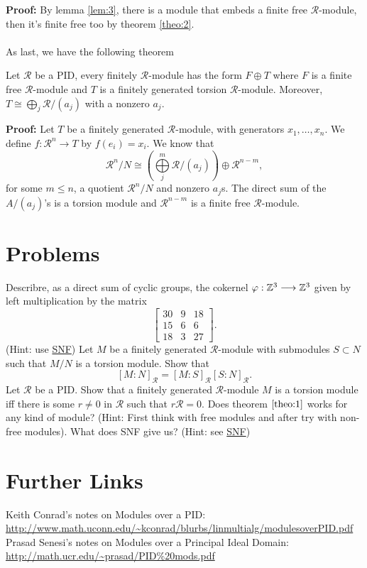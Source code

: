 \documentclass[11pt]{scrartcl}
\newcommand{\CR}{\mathcal R}
\begin{document}
\textbf{Proof: }By lemma \ref{lem:3}, there is a module that embeds a finite
free $\CR$-module, then it's finite free too by theorem \ref{theo:2}. \qedsymbol \\ \\
As last, we have the following theorem
\begin{theorem}
  \label{lem:5}
  Let $\CR$ be a PID, every finitely $\CR$-module has the form $F \oplus T$ where
  $F$ is a finite free $\CR$-module and $T$ is a finitely generated torsion
  $\CR$-module. Moreover, $T \cong \bigoplus\limits_{j} \CR/(a_{j})$ with a nonzero $a_{j}$.
\end{theorem}
\textbf{Proof: }Let $T$ be a finitely generated $\CR$-module, with generators
$x_{1}, \dots, x_{n}$. We define $f:\CR^{n} \longrightarrow T$ by $f(e_{i}) = x_{i}$. We know that 
$$
\CR^{n}/N \cong \left(\bigoplus\limits_{j}^{m} \CR/(a_{j})\right) \oplus \CR^{n-m},
$$
for some $m \leq n$, a quotient $\CR^{n}/N$ and nonzero $a_{j}$s. The direct
sum of the $A/(a_{j})$'s is a torsion module and $\CR^{n-m}$ is a finite
free $\CR$-module. \qedsymbol
\section{Problems}
\begin{enumerate}[1.]
    \ii Describre, as a direct sum of cyclic groups, the cokernel $\varphi: \mathbb Z^{3} \longrightarrow \mathbb Z^{3}$ given by left multiplication by the matrix
    $$
    \left[ \begin{matrix}
      30 & 9 & 18 \\
      15 & 6 & 6 \\
      18 & 3 & 27
    \end{matrix} \right].
    $$
    (Hint: use \href{http://math.stackexchange.com/questions/1797112/describe-as-a-direct-sum-of-cyclic-groups-given-a-map-phi-mathbbz3-l}{SNF})
    \ii Let $M$ be a finitely generated $\CR$-module with submodules $S \subset N$
    such that $M/N$ is a torsion module. Show that
    $$
    [M:N]_{\CR} = [M:S]_{\CR}[S:N]_{\CR}.
    $$
    \ii Let $\CR$ be a PID. Show that a finitely generated $\CR$-module $M$
    is a torsion module iff there is some $r \neq 0$ in $\CR$ such that
    $r\CR = 0$.
    \ii Does theorem $\ref{theo:1}$ works for any kind of module? (Hint: First 
    think with free modules and after try with non-free modules).
    \ii What does SNF give us? (Hint: see \href{http://joelantonio.me/post/2016/06/02/Smith-Normal-Form-as-t    he-best-presentation-group/}{SNF})
\end{enumerate}
\section{Further Links}
\begin{itemize}
    \ii Keith Conrad's notes on Modules over a PID: \url{http://www.math.uconn.edu/~kconrad/blurbs/linmultialg/modulesoverPID.pdf} 
    \ii Prasad Senesi's notes on Modules over a Principal Ideal Domain: \url{http://math.ucr.edu/~prasad/PID%20mods.pdf} 
 \end{itemize}
\end{document}
